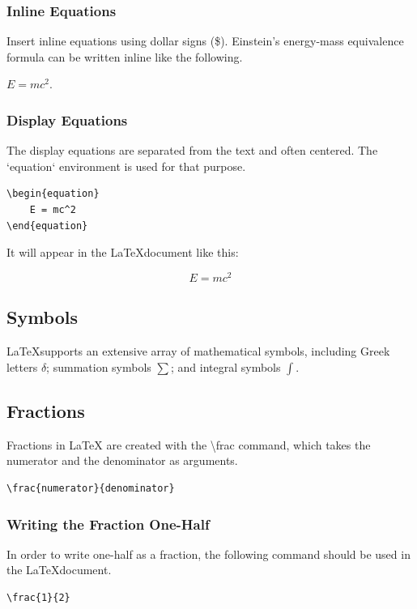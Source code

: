 \documentclass[12pt,journal,compsoc]{IEEEtran}
\begin{document}
\subsubsection{Inline Equations}
Insert inline equations using dollar signs (\$). Einstein's energy-mass equivalence formula can be written inline like the following. 

\( E = mc^2 \).

\subsubsection{Display Equations}
The display equations are separated from the text and often centered. The `equation` environment is used for that purpose.

\begin{verbatim}
\begin{equation}
    E = mc^2
\end{equation}
\end{verbatim}

It will appear in the \LaTeX document like this:

\begin{equation}
    E = mc^2
\end{equation}

\subsection{Symbols}
\LaTeX supports an extensive array of mathematical symbols, including Greek letters \( \delta \); summation symbols \( \sum \); and integral symbols \( \int \).

\subsection{Fractions}
Fractions in LaTeX are created with the \textbackslash frac{} command, which takes the numerator and the denominator as arguments. 

\begin{verbatim}
\frac{numerator}{denominator}
\end{verbatim}

\subsubsection{Writing the Fraction One-Half}

In order to write one-half as a fraction, the following command should be used in the \LaTeX document. 
\begin{verbatim}
\frac{1}{2}
\end{verbatim}
\end{document}
